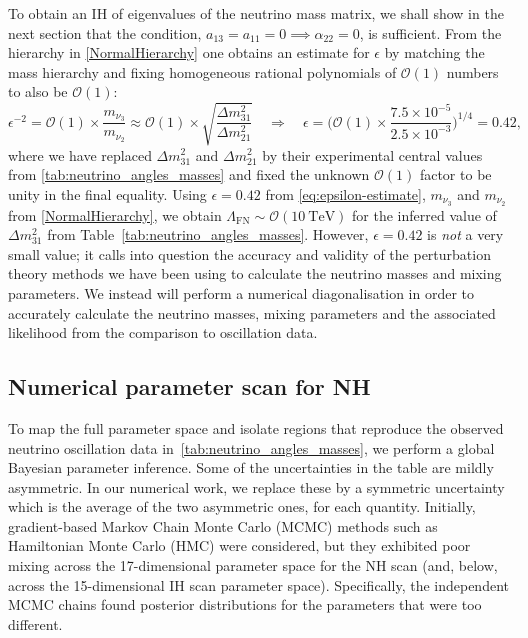 \documentclass[11pt,letterpaper]{article}
\begin{document}
To obtain an IH of eigenvalues of the neutrino mass matrix, we
shall show in the next section that the condition, $a_{13} = a_{11} = 0
\implies \alpha_{22} = 0$, is sufficient. From the hierarchy in \cref{NormalHierarchy} one obtains an estimate for $\epsilon$ by matching the mass hierarchy and fixing homogeneous rational polynomials of $\mathcal{O}(1)$ numbers to also be $\mathcal{O}(1)$:
\begin{equation}\label{eq:epsilon-estimate}
    \epsilon^{-2}=\mathcal{O}(1) \times \frac{m_{\nu_3}}{m_{\nu_2}}
    \approx\mathcal{O}(1) \times \sqrt{\frac{\Delta m^2_{31}}{\Delta m^2_{21}}}
    \quad\Rightarrow\quad
    \epsilon = \Big(\mathcal{O}(1) \times \frac{7.5\times 10^{-5}}{2.5\times 10^{-3}}\Big)^{1/4} = 0.42, 
\end{equation}
where we have  replaced $\Delta m_{31}^2$ and $\Delta m_{21}^2$ by their experimental central values from \cref{tab:neutrino_angles_masses} and fixed the unknown $\mathcal{O}(1)$ factor to be unity in the final equality.
Using $\epsilon=0.42$ from \cref{eq:epsilon-estimate}, $m_{\nu_3}$ and
$m_{\nu_2}$ from \cref{NormalHierarchy}, we obtain $\Lambda_{\text{FN}} \sim \mathcal{O}(10 \ \mathrm{TeV})$ for the inferred value of $\Delta m_{31}^2$ from Table~\ref{tab:neutrino_angles_masses}. 
However, $\epsilon=0.42$ is \emph{not} a very small value; it calls into
question the accuracy and validity of the perturbation theory methods we have
been using to calculate the neutrino masses and mixing parameters. We instead
will perform a numerical diagonalisation in order to
accurately calculate the neutrino masses, mixing parameters and 
the associated likelihood from the comparison to oscillation data.

\subsection{Numerical parameter scan for NH} \label{sec:num}

To map the full parameter space and isolate regions that reproduce the observed neutrino oscillation data in~\cref{tab:neutrino_angles_masses}, we perform a global Bayesian parameter inference. Some of the uncertainties in the table are
mildly asymmetric. In our numerical work, we replace these by a symmetric
uncertainty which is the average of the two asymmetric ones, for each quantity.
Initially, gradient-based Markov Chain
Monte Carlo (MCMC) methods such as Hamiltonian Monte Carlo (HMC) were
considered, but they exhibited poor mixing across the 17-dimensional parameter
space for the NH scan (and, below, across the 15-dimensional IH scan parameter
space). Specifically, the independent MCMC chains 
found posterior distributions for the parameters that were too different. 
\end{document}
